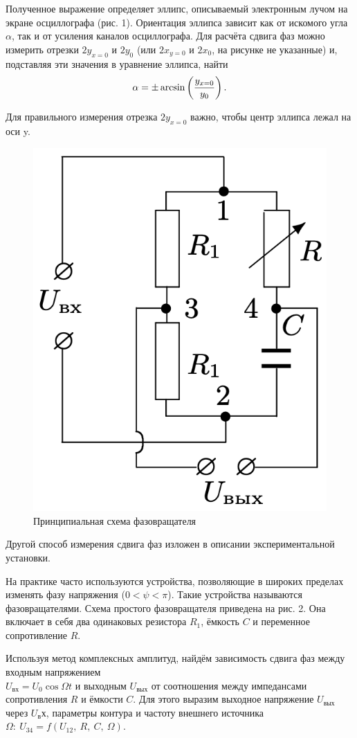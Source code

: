 \documentclass[12pt,a4paper]{article}
\begin{document}
Полученное выражение определяет эллипс, описываемый электронным лучом на экране осциллографа (рис. 1). 
Ориентация эллипса зависит как от искомого угла $\alpha$, так и от усиления каналов осциллографа. 
Для расчёта сдвига фаз можно измерить отрезки $2y_{x=0}$ и $2y_0$ (или $2x_{y=0}$ и $2x_0$, на рисунке не указанные) и, подставляя эти значения в уравнение эллипса, найти $$\alpha = \pm \arcsin \left({y_{x=0} \over y_0}\right).$$

Для правильного измерения отрезка $2y_{x=0}$ важно, чтобы центр эллипса лежал на оси y.

\newpage

\begin{figure}
    \includegraphics[width=0.8\linewidth]{pics/phase.png}
    \caption{Принципиальная схема фазовращателя}
\end{figure}
Другой способ измерения сдвига фаз изложен в описании экспериментальной установки.

На практике часто используются устройства, позволяющие в широких пределах изменять фазу напряжения ($0 < \psi < \pi$). 
Такие устройства называются фазовращателями. 
Схема простого фазовращателя приведена на рис. 2. 
Она включает в себя два одинаковых резистора $R_1$, ёмкость $C$ и переменное сопротивление $R$.

Используя метод комплексных амплитуд, найдём зависимость сдвига фаз между входным напряжением  \\ $U_{вх} = U_0 \cos \Omega t$ и выходным $U_{вых}$ от соотношения между импедансами сопротивления $R$ и ёмкости $C$. 
Для этого выразим выходное напряжение $U_{вых}$ через $U_вх$, параметры контура и частоту внешнего источника $\Omega:\ U_{34} = f(U_{12},\ R,\ C,\ \Omega)$.
\end{document}
